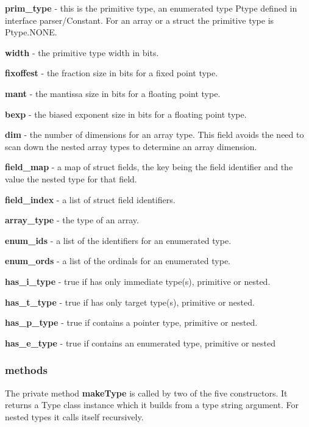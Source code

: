 \documentclass[10pt,a4paper,twoside,fleqn]{book}
\begin{document}
                {\bf prim\_type} - this is the primitive type, an enumerated type Ptype
                defined in interface parser/Constant. For an array or a struct the
                primitive type is Ptype.NONE.

                {\bf width} - the primitive type width in bits.

                {\bf fixoffest} - the fraction size in bits for a fixed point type.

                {\bf mant} - the mantissa size in bits for a floating point type.

                {\bf bexp} - the biased exponent size in bits for a floating point type.

                {\bf dim} - the number of dimensions for an array type. This field avoids
                the need to scan down the nested array types to determine an array
                dimension.

                {\bf field\_map} - a map of struct fields, the key being the field identifier
                and the value the nested type for that field.

                {\bf field\_index} - a list of struct field identifiers.

                {\bf array\_type} - the type of an array.

                {\bf enum\_ids} - a list of the identifiers for an enumerated type.

                {\bf enum\_ords} - a list of the ordinals for an enumerated type.

                {\bf has\_i\_type} - true if has only immediate type(s), primitive or nested.

                {\bf has\_t\_type} - true if has only target type(s), primitive or nested.

                {\bf has\_p\_type} - true if contains a pointer type, primitive or nested.

                {\bf has\_e\_type} - true if contains an enumerated type, primitive or nested

            \subsubsection{methods}

                The private method {\bf makeType} is called by two of the five
                constructors. It returns a Type class instance which it builds from
                a type string argument. For nested types it calls itself
                recursively.
\end{document}
